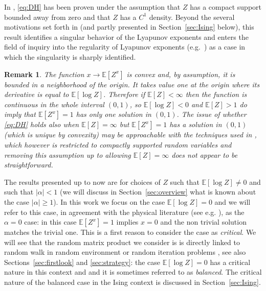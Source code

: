 \documentclass[reqno,11pt]{amsart}
\numberwithin{equation}{section}
\newtheorem{rem}[theorem]{Remark}
\newcommand{\bbE}{{\ensuremath{\mathbb E}} }
\newcommand{\ga}{\alpha}
\begin{document}
  In \cite{cf:GGG}, \eqref{eq:DH} has been proven under the assumption that $Z$ has a compact support bounded away from zero and that $Z$ has a $C^1$ density. 
  Beyond  the several motivations set forth in \cite{cf:CPV,cf:DH} (and partly presented in Section~\ref{sec:Ising} below), this result identifies a singular behavior of the Lyapunov exponents and enters the field of inquiry into the regularity of Lyapunov exponents (e.g.\ \cite{cf:lepage,cf:BaDu}) as a case in which the singularity is sharply identified. 
  
\smallskip

\begin{rem}
\label{rem:alpha}
The function $x \longrightarrow \bbE[Z^x]$ is convex and, by  assumption, it is bounded in a neighborhood of the origin.  It takes value one at the origin where its derivative  is equal to $\bbE[\log Z]$. Therefore if
$\bbE[Z]< \infty$ then  the function is continuous in the whole interval $(0,1)$, so 
$\bbE[ \log Z]< 0$ and $\bbE [Z]>1$ do imply that $\bbE[Z^x]=1$ has only one solution in $(0,1)$. 
 The issue of whether \eqref{eq:DH} holds also when $\bbE[Z]=\infty$ but $\bbE[Z^x]=1$ has a solution in $(0,1)$ (which is unique by convexity)
 may be approachable with the techniques used in \cite{cf:GGG}, which however is restricted to compactly supported random variables and removing this assumption up to allowing $\bbE [Z]=\infty$ does not appear to be straightforward.
 \end{rem} 
  
    
\smallskip

The results presented up to now are for choices of $Z$ such that $\bbE[\log Z]\neq 0$ and such that $\vert \ga \vert <1$ (we will discuss in Section~\ref{sec:overview} what is known about the case $\vert \ga \vert\ge 1$).  In this work we focus on the case $\bbE[\log Z]=0$ and we will refer to this case, in agreement with the physical literature (see e.g. \cite[p.~1220]{cf:NL}), as the $\ga=0$ case:  in this case   
$\bbE[Z^x]=1$ implies $x=0$ and  the non trivial solution matches  the trivial one. This is a first reason to consider the case as \emph{critical}. We will see that the random matrix product we consider is 
  is directly linked to random walk in random environment or random iteration problems  \cite{cf:BBE,cf:BBD,cf:BDMbook,cf:Sinai}, see also Sections~\ref{sec:firstlook} and \ref{sec:strategy}:   the case $\bbE[\log Z]=0$ has a critical nature in this context and and it is sometimes   referred to as \emph{balanced}.   The critical nature of the balanced case in the Ising context is discussed in Section~\ref{sec:Ising}. 
\end{document}
